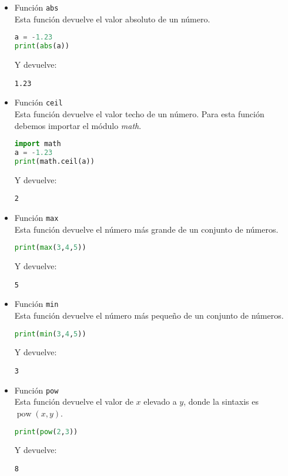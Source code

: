	\begin{itemize}
		\item Función \texttt{abs}\\
		Esta función devuelve el valor absoluto de un número.
		\begin{lstlisting}[language={python}]
a = -1.23
print(abs(a))
		\end{lstlisting}
		Y devuelve:
		\begin{lstlisting}[language={[latex]tex}]
1.23		
		\end{lstlisting}
		\item Función \texttt{ceil}\\
		Esta función devuelve el valor techo de un número. Para esta función debemos importar el módulo \emph{math}.
		\begin{lstlisting}[language={python}]
import math
a = -1.23
print(math.ceil(a))
		\end{lstlisting}
		Y devuelve:
		\begin{lstlisting}[language={[latex]tex}]
2
		\end{lstlisting}
		\item Función \texttt{max}\\
		Esta función devuelve el número más grande de un conjunto de números.
		\begin{lstlisting}[language={python}]
print(max(3,4,5))
		\end{lstlisting}
		Y devuelve:
		\begin{lstlisting}[language={[latex]tex}]
5
		\end{lstlisting}
		\item Función \texttt{min}\\
		Esta función devuelve el número más pequeño de un conjunto de números.
		\begin{lstlisting}[language={python}]
print(min(3,4,5))
		\end{lstlisting}
		Y devuelve:
		\begin{lstlisting}[language={[latex]tex}]
3
		\end{lstlisting}
		\item Función \texttt{pow}\\
		Esta función devuelve el valor de $ x $ elevado a $ y $, donde la sintaxis es $ \operatorname{pow}(x,y) $.
		\begin{lstlisting}[language={python}]
print(pow(2,3))
		\end{lstlisting}
		Y devuelve:
		\begin{lstlisting}[language={[latex]tex}]
8
		\end{lstlisting}

\end{itemize}
